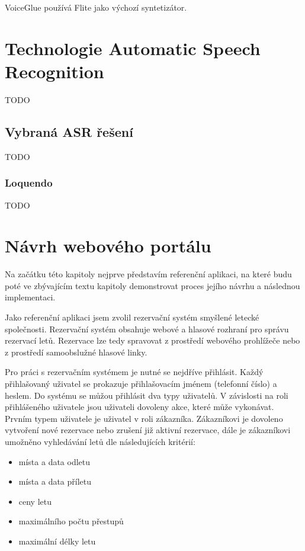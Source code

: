 \documentclass[ing,male,java,dept460]{diploma}						%
\begin{document}
VoiceGlue používá Flite jako výchozí syntetizátor.

\section{Technologie Automatic Speech Recognition}
\label{sec:ASR}
TODO

\subsection{Vybraná ASR řešení}
TODO

\subsubsection{Loquendo}
TODO

\section{Návrh webového portálu}
\label{sec:Navrh}
Na začátku této kapitoly nejprve představím referenční aplikaci, na které budu poté ve zbývajícím textu kapitoly demonstrovat proces jejího návrhu a následnou implementaci.

Jako referenční aplikaci jsem zvolil rezervační systém smyšlené letecké společnosti. Rezervační systém obsahuje webové a hlasové rozhraní pro správu rezervací letů. Rezervace lze tedy spravovat z prostředí webového prohlížeče nebo z prostředí samoobslužné hlasové linky.

Pro práci s rezervačním systémem je nutné se nejdříve přihlásit. Každý přihlašovaný uživatel se prokazuje přihlašovacím jménem (telefonní číslo) a heslem. Do systému se můžou přihlásit dva typy uživatelů. V závislosti na roli přihlášeného uživatele jsou uživateli dovoleny akce, které může vykonávat. Prvním typem uživatele je uživatel v roli zákazníka. Zákazníkovi je dovoleno vytvoření nové rezervace nebo zrušení již aktivní rezervace, dále je zákazníkovi umožněno vyhledávání letů dle následujících kritérií:

\begin{itemize}
\item místa a data odletu
\item místa a data příletu
\item ceny letu
\item maximálního počtu přestupů
\item maximální délky letu
\end{itemize}
\end{document}
